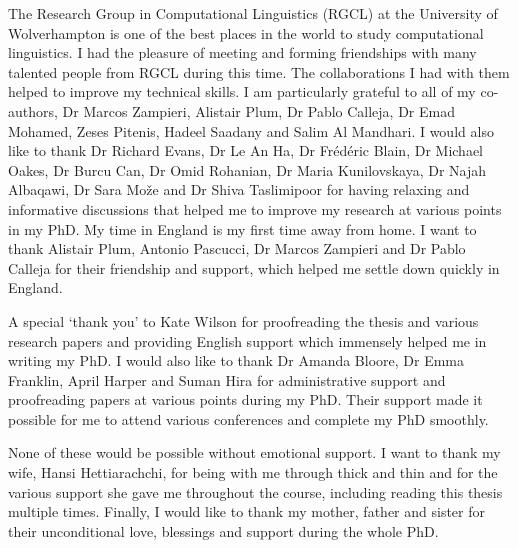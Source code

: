 The Research Group in Computational Linguistics (RGCL) at the University of Wolverhampton is one of the best places in the world to study computational linguistics. I had the pleasure of meeting and forming friendships with many talented people from RGCL during this time. The collaborations I had with them helped to improve my technical skills. I am particularly grateful to all of my co-authors, Dr Marcos Zampieri, Alistair Plum, Dr Pablo Calleja, Dr Emad Mohamed, Zeses Pitenis, Hadeel Saadany and Salim Al Mandhari. I would also like to thank Dr Richard Evans, Dr Le An Ha, Dr Frédéric Blain, Dr Michael Oakes, Dr Burcu Can, Dr Omid Rohanian, Dr Maria Kunilovskaya, Dr Najah Albaqawi, Dr Sara Može and Dr Shiva Taslimipoor for having relaxing and informative discussions that helped me to improve my research at various points in my PhD. My time in England is my first time away from home. I want to thank Alistair Plum, Antonio Pascucci, Dr Marcos Zampieri and Dr Pablo Calleja for their friendship and support, which helped me settle down quickly in England.  

A special ‘thank you’ to Kate Wilson for proofreading the thesis and various research papers and providing English support which immensely helped me in writing my PhD. I would also like to thank Dr Amanda Bloore, Dr Emma Franklin, April Harper and Suman Hira for administrative support and proofreading papers at various points during my PhD. Their support made it possible for me to attend various conferences and complete my PhD smoothly.

None of these would be possible without emotional support. I want to thank my wife, Hansi Hettiarachchi, for being with me through thick and thin and for the various support she gave me throughout the course, including reading this thesis multiple times. Finally, I would like to thank my mother, father and sister for their unconditional love, blessings and support during the whole PhD.




